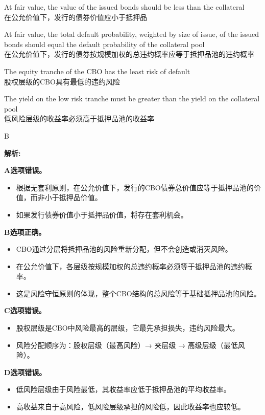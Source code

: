 \documentclass{article}
\newenvironment{explanation}
{\textbf{解析:}\par}
{\par}
\begin{document}
\begin{choices}
    \item At fair value, the value of the issued bonds should be less than the collateral\\
    在公允价值下，发行的债券价值应小于抵押品
    \item At fair value, the total default probability, weighted by size of issue, of the issued bonds should equal the default probability of the collateral pool\\
    在公允价值下，发行的债券按规模加权的总违约概率应等于抵押品池的违约概率
    \item The equity tranche of the CBO has the least risk of default\\
    股权层级的CBO具有最低的违约风险
    \item The yield on the low risk tranche must be greater than the yield on the collateral pool\\
    低风险层级的收益率必须高于抵押品池的收益率
\end{choices}

\begin{correctanswer}
    B
\end{correctanswer}

\begin{explanation}
    \textbf{A选项错误。}
    \begin{itemize}
        \item 根据无套利原则，在公允价值下，发行的CBO债券总价值应等于抵押品池的价值，而非小于抵押品价值。
        \item 如果发行债券价值小于抵押品价值，将存在套利机会。
    \end{itemize}

    \textbf{B选项正确。}
    \begin{itemize}
        \item CBO通过分层将抵押品池的风险重新分配，但不会创造或消灭风险。
        \item 在公允价值下，各层级按规模加权的总违约概率必须等于抵押品池的违约概率。
        \item 这是风险守恒原则的体现，整个CBO结构的总风险等于基础抵押品池的风险。
    \end{itemize}

    \textbf{C选项错误。}
    \begin{itemize}
        \item 股权层级是CBO中风险最高的层级，它最先承担损失，违约风险最大。
        \item 风险分配顺序为：股权层级（最高风险）→ 夹层级 → 高级层级（最低风险）。
    \end{itemize}

    \textbf{D选项错误。}
    \begin{itemize}
        \item 低风险层级由于风险最低，其收益率应低于抵押品池的平均收益率。
        \item 高收益来自于高风险，低风险层级承担的风险低，因此收益率也应较低。
    \end{itemize}
\end{explanation}
\end{document}

